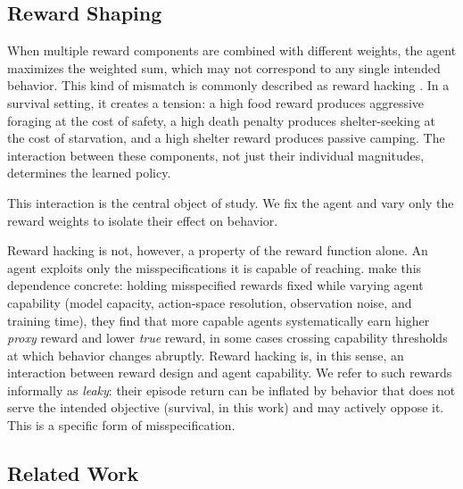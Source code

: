 \documentclass[12pt,a4paper,titlepage]{article}
\begin{document}
\subsection{Reward Shaping}
\label{sec:reward_shaping_bg}

When multiple reward components are combined with different weights, the agent maximizes the weighted sum, which may not correspond to any single intended behavior. This kind of mismatch is commonly described as reward hacking \citep{Amodei2016}. In a survival setting, it creates a tension: a high food reward produces aggressive foraging at the cost of safety, a high death penalty produces shelter-seeking at the cost of starvation, and a high shelter reward produces passive camping. The interaction between these components, not just their individual magnitudes, determines the learned policy.

This interaction is the central object of study. We fix the agent and vary only the reward weights to isolate their effect on behavior.

Reward hacking is not, however, a property of the reward function alone. An agent exploits only the misspecifications it is capable of reaching. \citet{Pan2022} make this dependence concrete: holding misspecified rewards fixed while varying agent capability (model capacity, action-space resolution, observation noise, and training time), they find that more capable agents systematically earn higher \emph{proxy} reward and lower \emph{true} reward, in some cases crossing capability thresholds at which behavior changes abruptly. Reward hacking is, in this sense, an interaction between reward design and agent capability. We refer to such rewards informally as \emph{leaky}: their episode return can be inflated by behavior that does not serve the intended objective (survival, in this work) and may actively oppose it. This is a specific form of misspecification.

\subsection{Related Work}
\label{sec:related_work}
\end{document}
